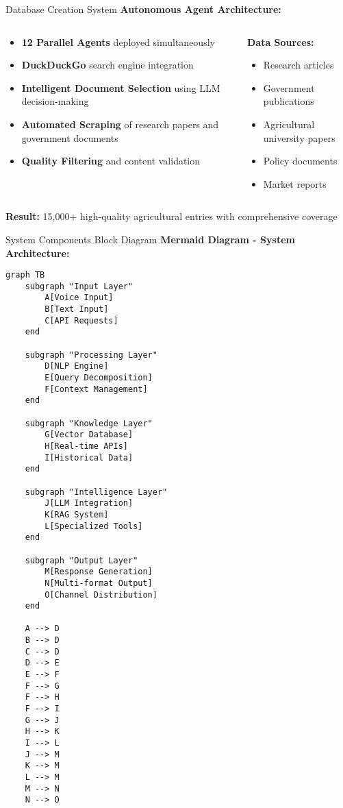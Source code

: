 \documentclass[aspectratio=169]{beamer}
\begin{document}
\begin{frame}{Database Creation System}
\textbf{Autonomous Agent Architecture:}

\begin{columns}
\begin{column}{0.6\textwidth}
\begin{itemize}
\item \textbf{12 Parallel Agents} deployed simultaneously
\item \textbf{DuckDuckGo} search engine integration
\item \textbf{Intelligent Document Selection} using LLM decision-making
\item \textbf{Automated Scraping} of research papers and government documents
\item \textbf{Quality Filtering} and content validation
\end{itemize}
\end{column}
\begin{column}{0.4\textwidth}
\textbf{Data Sources:}
\begin{itemize}
\item Research articles
\item Government publications
\item Agricultural university papers
\item Policy documents
\item Market reports
\end{itemize}
\end{column}
\end{columns}

\vspace{0.3cm}
\textbf{Result:} 15,000+ high-quality agricultural entries with comprehensive coverage
\end{frame}

\begin{frame}{System Components Block Diagram}
\textbf{Mermaid Diagram - System Architecture:}

\begin{small}
\begin{verbatim}
graph TB
    subgraph "Input Layer"
        A[Voice Input] 
        B[Text Input]
        C[API Requests]
    end
    
    subgraph "Processing Layer"
        D[NLP Engine]
        E[Query Decomposition]
        F[Context Management]
    end
    
    subgraph "Knowledge Layer"
        G[Vector Database]
        H[Real-time APIs]
        I[Historical Data]
    end
    
    subgraph "Intelligence Layer"
        J[LLM Integration]
        K[RAG System]
        L[Specialized Tools]
    end
    
    subgraph "Output Layer"
        M[Response Generation]
        N[Multi-format Output]
        O[Channel Distribution]
    end
    
    A --> D
    B --> D
    C --> D
    D --> E
    E --> F
    F --> G
    F --> H
    F --> I
    G --> J
    H --> K
    I --> L
    J --> M
    K --> M
    L --> M
    M --> N
    N --> O
\end{verbatim}
\end{small}
\end{frame}
\end{document}
